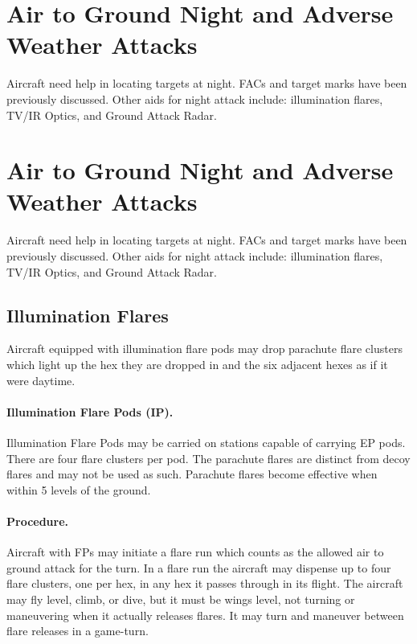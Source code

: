 \begin{advancedrules}
\begin{itemize}
\end{itemize}

\section{Air to Ground Night and Adverse Weather Attacks}

Aircraft need help in locating targets at night. FACs and target marks have been previously discussed. Other aids for night attack include: illumination flares, TV/IR Optics, and Ground Attack Radar.

\section{Air to Ground Night and Adverse Weather Attacks}

Aircraft need help in locating targets at night. FACs and target marks have been previously discussed. Other aids for night attack include: illumination flares, TV/IR Optics, and Ground Attack Radar.


\subsection{Illumination Flares}

Aircraft equipped with illumination flare pods may drop parachute flare clusters which light up the hex they are dropped in and the six adjacent hexes as if it were daytime.

\paragraph{Illumination Flare Pods (IP).} Illumination Flare Pods may be carried on stations capable of carrying EP pods. There are four flare clusters per pod. The parachute flares are distinct from decoy flares and may not be used as such. Parachute flares become effective when within 5 levels of the ground.

\paragraph{Procedure.} Aircraft with FPs may initiate a flare run which counts as the allowed air to ground attack for the turn. In a flare run the aircraft may dispense up to four flare clusters, one per hex, in any hex it passes through in its flight. The aircraft may fly level, climb, or dive, but it must be wings level, not turning or maneuvering when it actually releases flares. It may turn and maneuver between flare releases in a game-turn.


\end{advancedrules}
